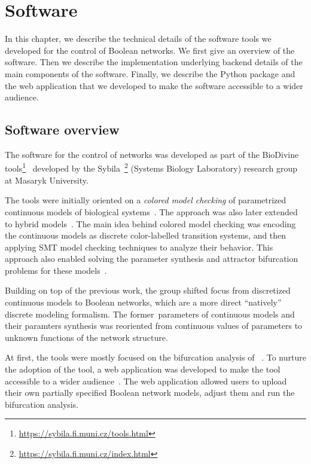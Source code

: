 \chapter{Software}
\label{chapter:software}

In this chapter, we describe the technical details of the software tools we developed for the control of Boolean networks. We first give an overview of the software. Then we describe the implementation underlying backend details of the main components of the software. Finally, we describe the Python package and the web application that we developed to make the software accessible to a wider audience.

\section{Software overview}
\label{sec:software_architecture}

The software for the control of \PBN{} networks was developed as part of the BioDivine tools\footnote{\url{https://sybila.fi.muni.cz/tools.html}}~\cite{Barnat2009} developed by the Sybila~\footnote{\url{https://sybila.fi.muni.cz/index.html}} (Systems Biology Laboratory) research group at Masaryk University. 

The tools were initially oriented on a \emph{colored model checking} of parametrized continuous models of biological systems~\cite{Brim2015}. The approach was also later extended to hybrid models~\cite{Smijakova2020}. The main idea behind colored model checking was encoding the continuous models as discrete color-labelled transition systems, and then applying SMT model checking techniques to analyze their behavior. This approach also enabled solving the parameter synthesis and attractor bifurcation problems for these models~\cite{Benes2016,Benes2017}.

Building on top of the previous work, the group shifted focus from discretized continuous models to Boolean networks, which are a more direct ``natively'' discrete modeling formalism. The former parameters of continuous models and their paramters synthesis was reoriented from continuous values of parameters to unknown functions of the network structure.

At first, the tools were mostly focused on the bifurcation analysis of \PBN{}~\cite{Benes2019}. To nurture the adoption of the tool, a web application was developed to make the tool accessible to a wider audience~\cite{aeon}. The web application allowed users to upload their own partially specified Boolean network models, adjust them and run the bifurcation analysis. 

